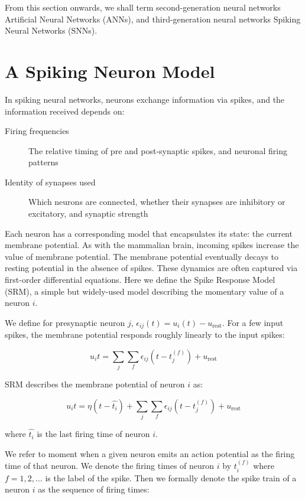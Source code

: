 \documentclass[fyp]{socreport}
\begin{document}
From this section onwards, we shall term second-generation neural networks
Artificial Neural Networks (ANNs), and third-generation neural networks Spiking
Neural Networks (SNNs).

\section{A Spiking Neuron Model\label{sec:spiking-neuron-model}}

In spiking neural networks, neurons exchange information via spikes, and the
information received depends on:

\begin{description}
\item[{Firing frequencies}] The relative timing of pre and post-synaptic spikes,
and neuronal firing patterns
\item[{Identity of synapses used}] Which neurons are connected, whether their
synapses are inhibitory or excitatory, and synaptic strength
\end{description}

Each neuron has a corresponding model that encapsulates its state: the current
membrane potential. As with the mammalian brain, incoming spikes increase the
value of membrane potential. The membrane potential eventually decays to resting
potential in the absence of spikes. These dynamics are often captured via
first-order differential equations. Here we define the Spike Response Model
(SRM), a simple but widely-used model describing the momentary value of a neuron
\(i\).

We define for presynaptic neuron \(j\),
\(\epsilon_{ij}(t) = u_{i}(t) - u_{\text{rest}}\). For a few input spikes, the
membrane potential responds roughly linearly to the input spikes:

\begin{equation} u_i{t} = \sum_{j}\sum_{f} \epsilon_{ij}(t - t_j^{(f)}) + u_{\text{rest}}
\end{equation}

SRM describes the membrane potential of neuron \(i\) as:

\begin{equation} u_i{t} = \eta (t - \hat{t_i}) + \sum_{j}\sum_{f} \epsilon_{ij}(t - t_j^{(f)}) + u_{\text{rest}}
\end{equation}

where \(\hat{t_i}\) is the last firing time of neuron \(i\).

We refer to moment when a given neuron emits an action potential as the firing
time of that neuron. We denote the firing times of neuron \(i\) by \(t_i^{(f)}\)
where \(f = 1,2,\dots\) is the label of the spike.  Then we formally denote the
spike train of a neuron \(i\) as the sequence of firing times:
\end{document}
